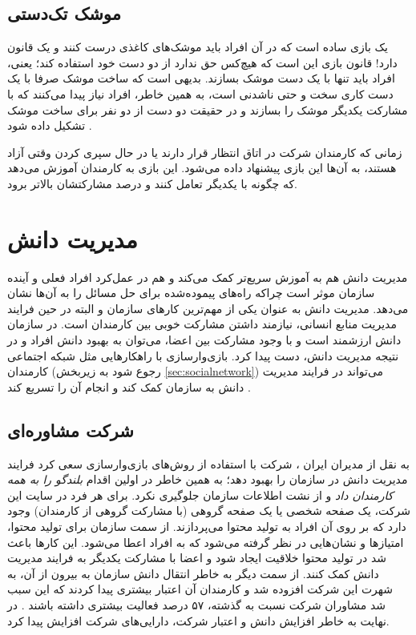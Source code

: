\subsection{موشک تک‌دستی}
یک بازی ساده است که در آن افراد باید موشک‌های کاغذی درست کنند و یک قانون دارد! قانون بازی این است که هیچ‌کس حق ندارد از دو دست خود استفاده کند؛ یعنی، افراد باید تنها با یک دست موشک بسازند. بدیهی است که ساخت موشک صرفا با یک دست کاری سخت و حتی ناشدنی است، به همین خاطر، افراد نیاز پیدا می‌کنند که با مشارکت یکدیگر موشک را بسازند و در حقیقت دو دست از دو نفر برای ساخت موشک تشکیل داده شود \cite{tedx}.

زمانی که کارمندان شرکت در اتاق انتظار قرار دارند یا در حال سپری کردن وقتی آزاد هستند، به آن‌ها این بازی پیشنهاد داده می‌شود. این بازی به کارمندان آموزش می‌دهد که چگونه با یکدیگر تعامل کنند و درصد مشارکتشان بالاتر برود.
\section{مدیریت دانش}
مدیریت دانش هم به آموزش سریع‌تر کمک می‌کند و هم در عمل‌کرد افراد فعلی و آینده سازمان موثر است چراکه راه‌های پیموده‌شده برای حل مسائل را به آن‌ها نشان می‌دهد. مدیریت دانش به عنوان یکی از مهم‌ترین کارهای سازمان و البته در حین فرایند مدیریت منابع انسانی، نیازمند داشتن مشارکت خوبی بین کارمندان است. در سازمان دانش ارزشمند است \cite{kmanagement} و با وجود مشارکت بین اعضا، می‌توان به بهبود دانش افراد و در نتیجه مدیریت دانش، دست پیدا کرد. بازی‌وارسازی با راهکارهایی مثل شبکه اجتماعی کارمندان (رجوع شود به زیربخش \ref{sec:socialnetwork}) می‌تواند در فرایند مدیریت دانش به سازمان کمک کند و انجام آن را تسریع کند \cite{amiriamin}.
\subsection{شرکت مشاوره‌ای }
به نقل از مدیران ایران \cite{modiran}، شرکت  با استفاده از روش‌های بازی‌وارسازی سعی کرد فرایند مدیریت دانش در سازمان را بهبود دهد؛ به همین خاطر در اولین اقدام \emph{بلندگو را به همه کارمندان داد} و از نشت اطلاعات سازمان جلوگیری نکرد. برای هر فرد در سایت این شرکت، یک صفحه شخصی یا یک صفحه گروهی (با مشارکت گروهی از کارمندان) وجود دارد که بر روی آن افراد به تولید محتوا می‌پردازند. از سمت سازمان برای تولید محتوا، امتیازها و نشان‌هایی در نظر گرفته می‌شود که به افراد اعطا می‌شود. این کارها باعث شد در تولید محتوا خلاقیت ایجاد شود و اعضا با مشارکت یکدیگر به فرایند مدیریت دانش کمک کنند. از سمت دیگر به خاطر انتقال دانش سازمان به بیرون از آن، به شهرت این شرکت افزوده شد و کارمندان آن اعتبار بیشتری پیدا کردند که این سبب شد مشاوران شرکت نسبت به گذشته، ۵۷ درصد فعالیت بیشتری داشته باشند \cite{bluewolf}. در نهایت به خاطر افزایش دانش و اعتبار شرکت، دارایی‌های شرکت افزایش پیدا کرد.


